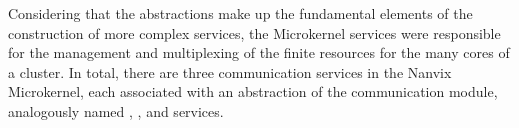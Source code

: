 		Considering that the abstractions make up the fundamental elements of
		the construction of more complex services, the Microkernel services
		were responsible for the management and multiplexing of the finite
		resources for the many cores of a cluster.
		In total, there are three communication services in the Nanvix Microkernel,
		each associated with an abstraction of the communication module,
		analogously named \sync, \mailbox, and \portal services.
